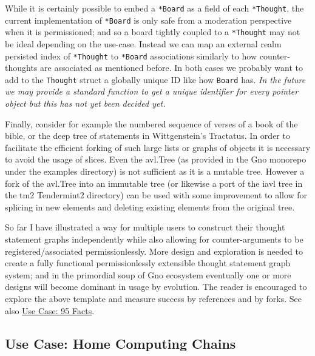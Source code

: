 \documentclass[12pt,a4paper]{article}
\newcommand{\passthrough}[1]{#1}
\begin{document}
While it is certainly possible to embed a
\passthrough{\lstinline!*Board!} as a field of each
\passthrough{\lstinline!*Thought!}, the current implementation of
\passthrough{\lstinline!*Board!} is only safe from a moderation
perspective when it is permissioned; and so a board tightly coupled to a
\passthrough{\lstinline!*Thought!} may not be ideal depending on the
use-case. Instead we can map an external realm persisted index of
\passthrough{\lstinline!*Thought!} to \passthrough{\lstinline!*Board!}
associations similarly to how counter-thoughts are associated as
mentioned before. In both cases we probably want to add to the
\passthrough{\lstinline!Thought!} struct a globally unique ID like how
\passthrough{\lstinline!Board!} has. \emph{In the future we may provide
a standard function to get a unique identifier for every pointer object
but this has not yet been decided yet.}

Finally, consider for example the numbered sequence of verses of a book
of the bible, or the deep tree of statements in Wittgenstein's
Tractatus. In order to facilitate the efficient forking of such large
lists or graphs of objects it is necessary to avoid the usage of slices.
Even the avl.Tree (as provided in the Gno monorepo under the examples
directory) is not sufficient as it is a mutable tree. However a fork of
the avl.Tree into an immutable tree (or likewise a port of the iavl tree
in the tm2 Tendermint2 directory) can be used with some improvement to
allow for splicing in new elements and deleting existing elements from
the original tree.

So far I have illustrated a way for multiple users to construct their
thought statement graphs independently while also allowing for
counter-arguments to be registered/associated permissionlessly. More
design and exploration is needed to create a fully functional
permissionlessly extensible thought statement graph system; and in the
primordial soup of Gno ecosystem eventually one or more designs will
become dominant in usage by evolution. The reader is encouraged to
explore the above template and measure success by references and by
forks. See also \hyperref[use-case-95-facts]{Use Case: 95 Facts}.

\subsection{Use Case: Home Computing
Chains}\label{use-case-home-computing-chains}
\end{document}
